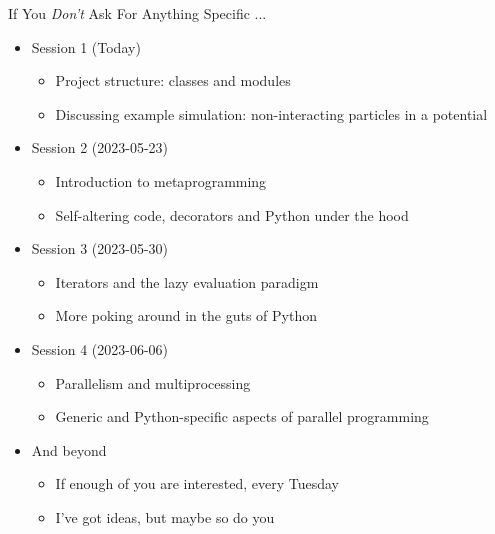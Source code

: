 \begin{frame}{If You \emph{Don't} Ask For Anything Specific ...}
%
\begin{itemize}
\item Session 1 (Today)
	\begin{itemize}
	\item Project structure: classes and modules
	\item Discussing example simulation: non-interacting particles in a potential
	\end{itemize}
\item Session 2 (2023-05-23)
	\begin{itemize}
	\item Introduction to metaprogramming
	\item Self-altering code, decorators and Python under the hood
	\end{itemize}
\item Session 3 (2023-05-30)
	\begin{itemize}
	\item Iterators and the lazy evaluation paradigm
	\item More poking around in the guts of Python
	\end{itemize}
\item Session 4 (2023-06-06)
	\begin{itemize}
	\item Parallelism and multiprocessing
	\item Generic and Python-specific aspects of parallel programming
	\end{itemize}
\item And beyond
	\begin{itemize}
	\item If enough of you are interested, every Tuesday
	\item I've got ideas, but maybe so do you
	\end{itemize}
\end{itemize}
%
\end{frame}


